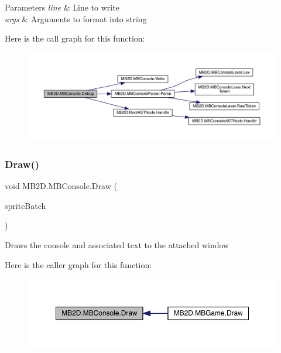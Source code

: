 \begin{DoxyParams}{Parameters}
{\em line} & Line to write\\
\hline
{\em args} & Arguments to format into string\\
\hline
\end{DoxyParams}
Here is the call graph for this function\+:
\nopagebreak
\begin{figure}[H]
\begin{center}
\leavevmode
\includegraphics[width=350pt]{class_m_b2_d_1_1_m_b_console_a918307d1a003684b1fa3e0d11243b1f9_cgraph}
\end{center}
\end{figure}
\hypertarget{class_m_b2_d_1_1_m_b_console_ab737469f6fe24b287f7979f788adb8c9}{}\label{class_m_b2_d_1_1_m_b_console_ab737469f6fe24b287f7979f788adb8c9} 
\subsubsection{\texorpdfstring{Draw()}{Draw()}}
{\footnotesize\ttfamily void M\+B2\+D.\+M\+B\+Console.\+Draw (\begin{DoxyParamCaption}\item[{Sprite\+Batch}]{sprite\+Batch }\end{DoxyParamCaption})\hspace{0.3cm}{\ttfamily [inline]}}



Draws the console and associated text to the attached window 

Here is the caller graph for this function\+:
\nopagebreak
\begin{figure}[H]
\begin{center}
\leavevmode
\includegraphics[width=350pt]{class_m_b2_d_1_1_m_b_console_ab737469f6fe24b287f7979f788adb8c9_icgraph}
\end{center}
\end{figure}
\hypertarget{class_m_b2_d_1_1_m_b_console_a745ef1f55523b29b83d4d94c1fe5400b}{}\label{class_m_b2_d_1_1_m_b_console_a745ef1f55523b29b83d4d94c1fe5400b} 
